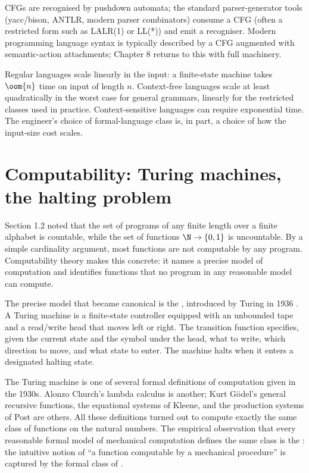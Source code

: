 CFGs are recognised by pushdown automata; the standard parser-generator tools (yacc/bison, ANTLR, modern parser combinators) consume a CFG (often a restricted form such as LALR(1) or LL(*)) and emit a recogniser. Modern programming language syntax is typically described by a CFG augmented with semantic-action attachments; Chapter 8 returns to this with full machinery.

\begin{archetype}[Scaling]
Regular languages scale linearly in the input: a finite-state machine takes $\oom{n}$ time on input of length $n$. Context-free languages scale at least quadratically in the worst case for general grammars, linearly for the restricted classes used in practice. Context-sensitive languages can require exponential time. The engineer's choice of formal-language class is, in part, a choice of how the input-size cost scales.
\end{archetype}

\section{Computability: Turing machines, the halting problem}

Section 1.2 noted that the set of programs of any finite length over a finite alphabet is countable, while the set of functions $\N \to \{0, 1\}$ is uncountable. By a simple cardinality argument, most functions are not computable by any program. Computability theory makes this concrete: it names a precise model of computation and identifies functions that no program in any reasonable model can compute.

The precise model that became canonical is the , introduced by Turing in 1936 \cite{paper:turing1936}. A Turing machine is a finite-state controller equipped with an unbounded tape and a read/write head that moves left or right. The transition function specifies, given the current state and the symbol under the head, what to write, which direction to move, and what state to enter. The machine halts when it enters a designated halting state.

The Turing machine is one of several formal definitions of computation given in the 1930s. Alonzo Church's lambda calculus \cite{hist:church1936} is another; Kurt Gödel's general recursive functions, the equational systems of Kleene, and the production systems of Post are others. All these definitions turned out to compute exactly the same class of functions on the natural numbers. The empirical observation that every reasonable formal model of mechanical computation defines the same class is the : the intuitive notion of ``a function computable by a mechanical procedure'' is captured by the formal class of .

